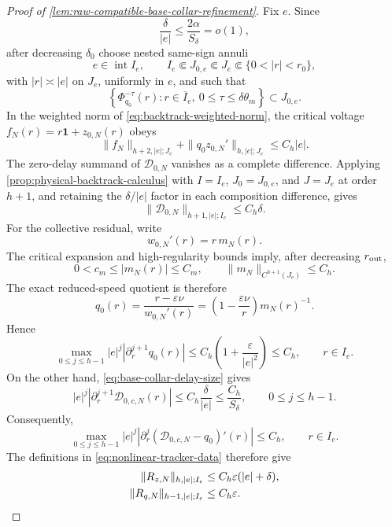 \begin{proof}[Proof of
\cref{lem:raw-compatible-base-collar-refinement}]
Fix \(e\).  Since
\[
 \frac{\delta}{|e|}
 \le\frac{2\alpha}{S_\delta}=o(1),
\]
after decreasing \(\delta_0\) choose nested same-sign annuli
\[
 e\in\operatorname{int}I_e,\qquad
 I_e\Subset J_{0,e}\Subset J_e\Subset
       \{0<|r|<r_0\},
\]
with \(|r|\asymp|e|\) on \(J_e\), uniformly in \(e\), and such that
\[
 \left\{\Phi_{q_0}^{-\tau}(r):
      r\in\overline I_e,\ 0\le\tau\le\delta\theta_m\right\}
 \subset J_{0,e}.
\]
In the weighted norm of \cref{eq:backtrack-weighted-norm}, the critical
voltage \(f_N(r)=r\mathbf1+z_{0,N}(r)\) obeys
\begin{equation}
 \|f_N\|_{h+2,|e|;J_e}
 +\|q_0z_{0,N}'\|_{h,|e|;J_e}
 \le C_h|e|.                                      \label{eq:base-collar-critical-size}
\end{equation}
The zero-delay summand of \(\mathcal D_{0,N}\) vanishes as a complete
difference.  Applying \cref{prop:physical-backtrack-calculus} with
\(I=I_e\), \(J_0=J_{0,e}\), and \(J=J_e\) at order \(h+1\), and retaining
the \(\delta/|e|\) factor in each composition difference, gives
\begin{equation}
 \|\mathcal D_{0,N}\|_{h+1,|e|;I_e}\le C_h\delta. \label{eq:base-collar-delay-size}
\end{equation}
For the collective residual, write
\[
 w_{0,N}'(r)=r\,m_N(r).
\]
The critical expansion and high-regularity bounds imply, after decreasing
\(r_{\rm out}\),
\[
 0<c_m\le |m_N(r)|\le C_m,\qquad
 \|m_N\|_{C^{h+1}(J_e)}\le C_h .
\]
The exact reduced-speed quotient is therefore
\[
 q_0(r)
 =\frac{r-\varepsilon\nu}{w_{0,N}'(r)}
 =\left(1-\frac{\varepsilon\nu}{r}\right)m_N(r)^{-1}.
\]
Hence
\[
 \max_{0\le j\le h-1}|e|^j
       |\partial_r^{j+1}q_0(r)|
 \le C_h\left(1+\frac{\varepsilon}{|e|^2}\right)
 \le C_h,\qquad r\in I_e.
\]
On the other hand, \cref{eq:base-collar-delay-size} gives
\[
 |e|^j|\partial_r^{j+1}\mathcal D_{0,c,N}(r)|
 \le C_h\frac{\delta}{|e|}
 \le\frac{C_h}{S_\delta},
 \qquad 0\le j\le h-1.
\]
Consequently,
\begin{equation}
 \max_{0\le j\le h-1}|e|^j
 \left|\partial_r^j
   (\mathcal D_{0,c,N}-q_0)'(r)\right|
 \le C_h,\qquad r\in I_e.                         \label{eq:base-collar-collective-derivative-size}
\end{equation}
The definitions in \cref{eq:nonlinear-tracker-data} therefore give
\begin{align}
 \|R_{z,N}\|_{h,|e|;I_e}
 &\le C_h\varepsilon(|e|+\delta),\notag\\
 \|R_{q,N}\|_{h-1,|e|;I_e}
 &\le C_h\varepsilon.                             \label{eq:base-collar-residual-size}
\end{align}


\end{proof}
